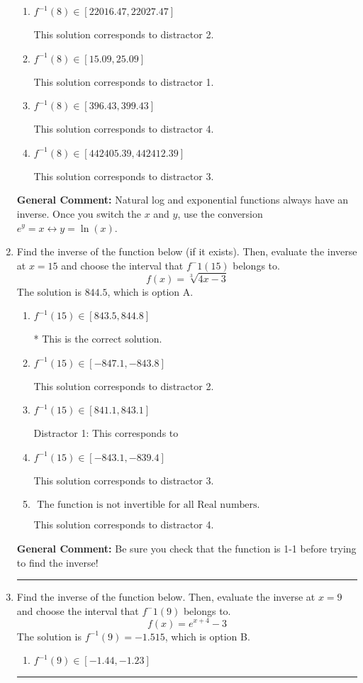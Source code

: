 \documentclass{extbook}[14pt]
\newcommand{\litem}[1]{\item #1

\rule{\textwidth}{0.4pt}}
\begin{document}
\begin{enumerate}
{\begin{enumerate}[label=\Alph*.]
 This is the solution.
\item \( f^{-1}(8) \in [22016.47, 22027.47] \)

 This solution corresponds to distractor 2.
\item \( f^{-1}(8) \in [15.09, 25.09] \)

 This solution corresponds to distractor 1.
\item \( f^{-1}(8) \in [396.43, 399.43] \)

 This solution corresponds to distractor 4.
\item \( f^{-1}(8) \in [442405.39, 442412.39] \)

 This solution corresponds to distractor 3.
\end{enumerate}

\textbf{General Comment:} Natural log and exponential functions always have an inverse. Once you switch the $x$ and $y$, use the conversion $ e^y = x \leftrightarrow y=\ln(x)$.
}
\litem{
Find the inverse of the function below (if it exists). Then, evaluate the inverse at $x = 15$ and choose the interval that $f^-1(15)$ belongs to.
\[ f(x) = \sqrt[3]{4 x - 3} \]The solution is \( 844.5 \), which is option A.\begin{enumerate}[label=\Alph*.]
\item \( f^{-1}(15) \in [843.5, 844.8] \)

* This is the correct solution.
\item \( f^{-1}(15) \in [-847.1, -843.8] \)

 This solution corresponds to distractor 2.
\item \( f^{-1}(15) \in [841.1, 843.1] \)

 Distractor 1: This corresponds to 
\item \( f^{-1}(15) \in [-843.1, -839.4] \)

 This solution corresponds to distractor 3.
\item \( \text{ The function is not invertible for all Real numbers. } \)

 This solution corresponds to distractor 4.
\end{enumerate}

\textbf{General Comment:} Be sure you check that the function is 1-1 before trying to find the inverse!
}
\litem{
Find the inverse of the function below. Then, evaluate the inverse at $x = 9$ and choose the interval that $f^-1(9)$ belongs to.
\[ f(x) = e^{x+4}-3 \]The solution is \( f^{-1}(9) = -1.515 \), which is option B.\begin{enumerate}[label=\Alph*.]
\item \( f^{-1}(9) \in [-1.44, -1.23] \)


\end{enumerate}}
\end{enumerate}
\end{document}
